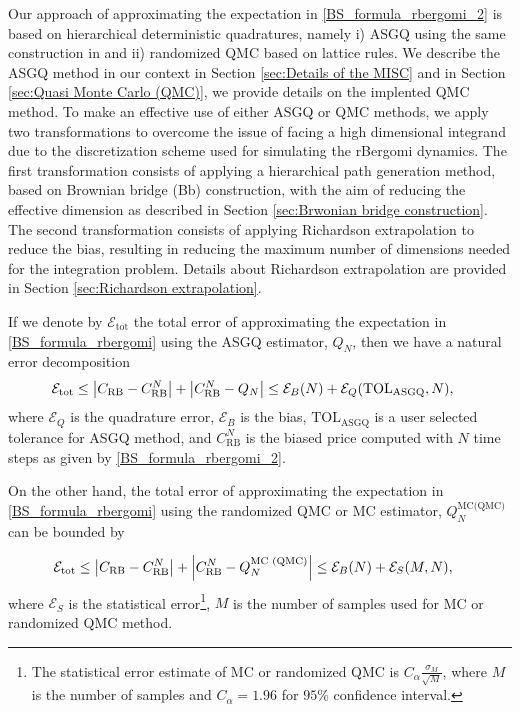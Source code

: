 Our approach of approximating the expectation in \eqref{BS_formula_rbergomi_2} is based on hierarchical deterministic quadratures, namely  i) ASGQ using the same construction in \cite{haji2016multi} and ii) randomized QMC based on lattice rules. We describe the ASGQ  method in our context in Section \ref{sec:Details of the MISC} and in Section \ref{sec:Quasi Monte Carlo (QMC)}, we provide details on the implented QMC method.  To make an effective use of either ASGQ or QMC methods, we   apply two transformations to overcome the issue of facing a high dimensional integrand due to the discretization scheme used for simulating the rBergomi dynamics. The first transformation consists of applying a hierarchical  path generation method, based on Brownian bridge (Bb) construction, with the aim of reducing the effective dimension as  described  in Section \ref{sec:Brwonian bridge construction}. The second transformation consists of applying Richardson extrapolation to reduce the bias, resulting in reducing  the maximum number of dimensions needed for the integration problem. Details about  Richardson extrapolation  are provided in Section \ref{sec:Richardson extrapolation}.

If we denote by $\mathcal{E}_{\text{tot}}$ the total error of approximating the  expectation in \eqref{BS_formula_rbergomi} using the ASGQ estimator, $Q_N$, then we have a natural error decomposition
\begin{align}\label{eq:total_error_ASGQ}
\mathcal{E}_{\text{tot}} & \le \left\lvert C_{\text{RB}}-C_{\text{RB}}^N\right\rvert+\left\lvert C_{\text{RB}}^N-Q_{N}\right\rvert \le \mathcal{E}_B(N)+ \mathcal{E}_Q(\text{TOL}_{\text{ASGQ}},N),
\end{align}
where  $\mathcal{E}_Q$ is the quadrature error, $\mathcal{E}_B$  is the bias, $\text{TOL}_{\text{ASGQ}}$ is a user selected tolerance for ASGQ method, and $C_{\text{RB}}^N$ is the biased price computed with $N$ time steps as given by \eqref{BS_formula_rbergomi_2}.

On the other hand, the total error of approximating the  expectation in \eqref{BS_formula_rbergomi} using the randomized QMC or MC estimator, $Q^{\text{MC(QMC)}}_N$ can be bounded by

\begin{align}\label{eq:total_error_MC}
	\mathcal{E}_{\text{tot}} & \le \left\lvert C_{\text{RB}}-C_{\text{RB}}^N\right\rvert+\left\lvert C_{\text{RB}}^N-Q^{\text{MC (QMC)}}_N\right\rvert \le \mathcal{E}_B(N)+ \mathcal{E}_{S}(M,N),
\end{align}
where  $\mathcal{E}_S$ is the statistical error\footnote{The statistical error estimate of MC or randomized QMC is  $C_{\alpha} \frac{\sigma_M}{\sqrt{M}}$, where $M$ is the number of samples and $C_{\alpha}=1.96$ for $95\%$ confidence interval.}, $M$ is the number of samples used for MC or randomized QMC method.
